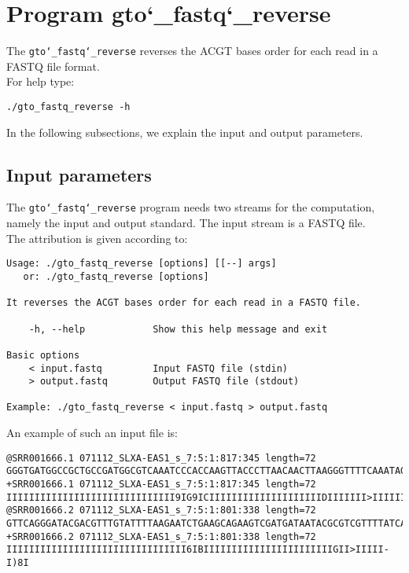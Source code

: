 \section{Program gto\char`_fastq\char`_reverse}
The \texttt{gto\char`_fastq\char`_reverse} reverses the ACGT bases order for each read in a FASTQ file format.\\
For help type:
\begin{lstlisting}
./gto_fastq_reverse -h
\end{lstlisting}
In the following subsections, we explain the input and output parameters.

\subsection*{Input parameters}

The \texttt{gto\char`_fastq\char`_reverse} program needs two streams for the computation, namely the input and output standard. The input stream is a FASTQ file.\\
The attribution is given according to:
\begin{lstlisting}
Usage: ./gto_fastq_reverse [options] [[--] args]
   or: ./gto_fastq_reverse [options]

It reverses the ACGT bases order for each read in a FASTQ file.

    -h, --help            Show this help message and exit

Basic options
    < input.fastq         Input FASTQ file (stdin)
    > output.fastq        Output FASTQ file (stdout)

Example: ./gto_fastq_reverse < input.fastq > output.fastq
\end{lstlisting}
An example of such an input file is:
\begin{lstlisting}
@SRR001666.1 071112_SLXA-EAS1_s_7:5:1:817:345 length=72
GGGTGATGGCCGCTGCCGATGGCGTCAAATCCCACCAAGTTACCCTTAACAACTTAAGGGTTTTCAAATAGA
+SRR001666.1 071112_SLXA-EAS1_s_7:5:1:817:345 length=72
IIIIIIIIIIIIIIIIIIIIIIIIIIIIII9IG9ICIIIIIIIIIIIIIIIIIIIIDIIIIIII>IIIIII/
@SRR001666.2 071112_SLXA-EAS1_s_7:5:1:801:338 length=72
GTTCAGGGATACGACGTTTGTATTTTAAGAATCTGAAGCAGAAGTCGATGATAATACGCGTCGTTTTATCAT
+SRR001666.2 071112_SLXA-EAS1_s_7:5:1:801:338 length=72
IIIIIIIIIIIIIIIIIIIIIIIIIIIIIIII6IBIIIIIIIIIIIIIIIIIIIIIIIGII>IIIII-I)8I
\end{lstlisting}

